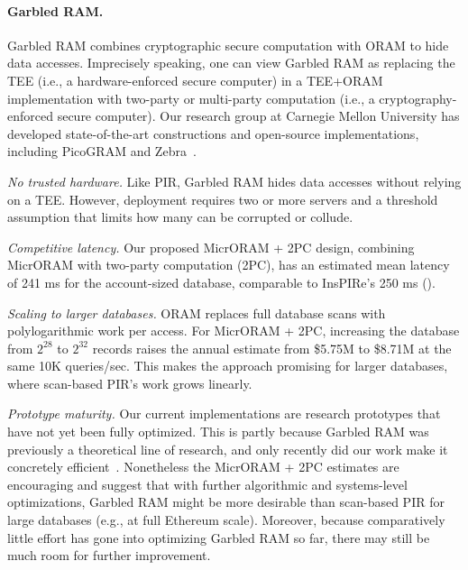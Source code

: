 \paragraph{Garbled RAM.}
Garbled RAM combines cryptographic secure computation with ORAM to hide data
accesses. Imprecisely speaking, one can view Garbled RAM as replacing the TEE
(i.e., a hardware-enforced secure computer) in a TEE+ORAM implementation with
two-party or multi-party computation (i.e., a cryptography-enforced secure
computer). Our research group at Carnegie Mellon University has developed
state-of-the-art constructions and open-source implementations, including
PicoGRAM and Zebra~\cite{picogram,zebra}.
\begin{pros}
\item \emph{No trusted hardware.} Like PIR, Garbled RAM hides data accesses
  without relying on a TEE.
However, deployment requires two or more
  servers and a threshold assumption that limits how many can be corrupted
  or collude.
\item \emph{Competitive latency.} Our proposed MicrORAM + 2PC design,
  combining MicrORAM with two-party computation (2PC), has an estimated
  mean latency of 241 ms for
  the account-sized database, comparable to InsPIRe's 250 ms
  ().
\item \emph{Scaling to larger databases.} ORAM replaces full database
  scans with polylogarithmic work per access. For MicrORAM + 2PC,
  increasing the database from $2^{28}$ to
  $2^{32}$ records raises the annual estimate from \$5.75M to \$8.71M
  at the same 10K queries/sec. This makes the approach promising for
  larger databases, where scan-based PIR's work grows linearly.
\end{pros}
\begin{cons}
\item \emph{Prototype maturity.} Our current implementations are research
  prototypes that have not yet been fully optimized. This is partly because
  Garbled RAM was previously a theoretical line of research, and only
  recently did our work make it concretely efficient~\cite{picogram,zebra}.
Nonetheless the MicrORAM + 2PC estimates
are encouraging and
suggest that with further algorithmic and systems-level optimizations,
Garbled RAM might be more desirable than scan-based PIR
for large databases (e.g., at full Ethereum scale).
Moreover, because comparatively little effort has gone into optimizing
Garbled RAM so far, there may still be much room for further improvement.
\end{cons}
\par
\endgroup

